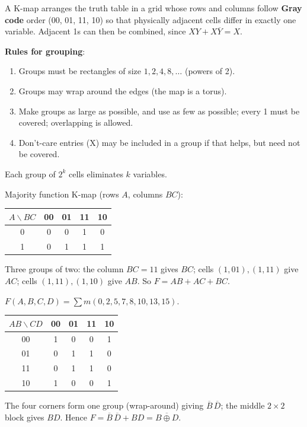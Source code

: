 A K-map arranges the truth table in a grid whose rows and columns follow
\textbf{Gray code} order (00, 01, 11, 10) so that physically adjacent cells
differ in exactly one variable. Adjacent 1s can then be combined, since
$XY + X\overline{Y} = X$.

\textbf{Rules for grouping}:
\begin{enumerate}
  \item Groups must be rectangles of size $1, 2, 4, 8, \ldots$ (powers of 2).
  \item Groups may wrap around the edges (the map is a torus).
  \item Make groups as large as possible, and use as few as possible; every
    1 must be covered; overlapping is allowed.
  \item Don't-care entries (X) may be included in a group if that helps,
    but need not be covered.
\end{enumerate}
Each group of $2^k$ cells eliminates $k$ variables.

\begin{example}
Majority function K-map (rows $A$, columns $BC$):
\begin{center}
\begin{tabular}{c|cccc}
$A \backslash BC$ & 00 & 01 & 11 & 10 \\
\hline
0 & 0 & 0 & 1 & 0 \\
1 & 0 & 1 & 1 & 1 \\
\end{tabular}
\end{center}
Three groups of two: the column $BC = 11$ gives $BC$; cells $(1,01),(1,11)$
give $AC$; cells $(1,11),(1,10)$ give $AB$. So $F = AB + AC + BC$.
\end{example}

\begin{example}
$F(A,B,C,D) = \sum m(0,2,5,7,8,10,13,15)$.
\begin{center}
\begin{tabular}{c|cccc}
$AB \backslash CD$ & 00 & 01 & 11 & 10 \\
\hline
00 & 1 & 0 & 0 & 1 \\
01 & 0 & 1 & 1 & 0 \\
11 & 0 & 1 & 1 & 0 \\
10 & 1 & 0 & 0 & 1 \\
\end{tabular}
\end{center}
The four corners form one group (wrap-around) giving $\overline{B}\,\overline{D}$;
the middle $2\times 2$ block gives $BD$. Hence
$F = \overline{B}\,\overline{D} + BD = \overline{B \oplus D}$.
\end{example}

